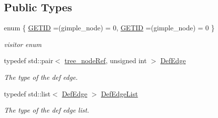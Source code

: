 \subsection*{Public Types}
\begin{DoxyCompactItemize}
\item 
enum \{ \hyperlink{structgimple__phi_a372f157945dd4358f30d58eda2f09ac9a0894a0df2a278d07a0998cf30c005525}{G\+E\+T\+ID} =(gimple\+\_\+node) = 0, 
\hyperlink{structgimple__phi_a372f157945dd4358f30d58eda2f09ac9a0894a0df2a278d07a0998cf30c005525}{G\+E\+T\+ID} =(gimple\+\_\+node) = 0
 \}\begin{DoxyCompactList}\small\item\em visitor enum \end{DoxyCompactList}
\item 
typedef std\+::pair$<$ \hyperlink{tree__node_8hpp_a6ee377554d1c4871ad66a337eaa67fd5}{tree\+\_\+node\+Ref}, unsigned int $>$ \hyperlink{structgimple__phi_a019724c668ca2269a031adfa47fbec7b}{Def\+Edge}
\begin{DoxyCompactList}\small\item\em The type of the def edge. \end{DoxyCompactList}\item 
typedef std\+::list$<$ \hyperlink{structgimple__phi_a019724c668ca2269a031adfa47fbec7b}{Def\+Edge} $>$ \hyperlink{structgimple__phi_abaf4e51c9be92bf7efbf5aaaab82f386}{Def\+Edge\+List}
\begin{DoxyCompactList}\small\item\em The type of the def edge list. \end{DoxyCompactList}\end{DoxyCompactItemize}

